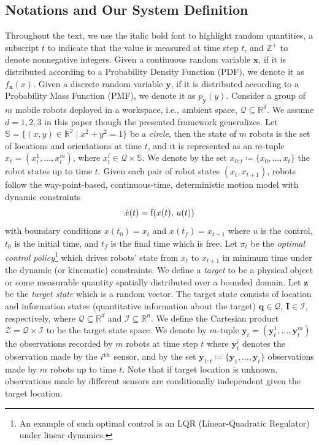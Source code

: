 \documentclass[journal]{IEEEtran}
\begin{document}
\subsection{Notations and Our System Definition}
Throughout the text, we use the italic bold font to highlight random quantities, a subscript $t$ to indicate that the value is measured at time step $t$, and $\mathbb{Z}^{+}$ to denote nonnegative integers. Given a continuous random variable $\bm{x}$, if it is distributed according to a Probability Density Function (PDF), we denote it as $f_{\bm{x}}(x)$. Given a discrete random variable $\bm{y}$, if it is distributed according to a Probability Mass Function (PMF), we denote it as $p_{\bm{y}}(y)$.
Consider a group of $m$ mobile robots deployed in a workspace, i.e., ambient space, $\mathcal{Q} \subseteq \mathbb{R}^d$. We assume $d=1,2,3$ in this paper though the presented framework generalizes. Let $\mathbb{S} =  \lbrace (x,y)\in \mathbb{R}^2\mid x^2+y^2=1 \rbrace$ be a \emph{circle}, then the state of $m$ robots is the set of locations and orientations at time $t$, and it is represented as an $m$-tuple $x_t = (x_t^1,\dots,x_t^m)$, where $x_t^i \in \mathcal{Q} \times \mathbb{S}$. We denote by the set  ${x}_{0:t}\coloneqq \lbrace {x}_0,\dots,{x}_t \rbrace$ the robot states up to time $t$. 
Given each pair of robot states $(x_t,x_{t+1})$, robots follow the way-point-based, continuous-time, deterministic motion model with dynamic constraints
\begin{equation}
\dot{x}(t) = \textup{f}(x(t),\,u(t))
\label{eq:constraint}
\end{equation}
with boundary conditions $x(t_0) = x_t$ and $x(t_f) = x_{t+1}$ where $u$ is the control, $t_0$ is the initial time, and $t_f$ is the final time which is free. Let $\pi_t$ be the \emph{optimal control policy}\footnote{An example of such optimal control is an LQR (Linear-Quadratic Regulator) under linear dynamics.} which drives robots' state from $x_t$ to $x_{t+1}$ in minimum time under the dynamic (or kinematic) constraints.
We define a \emph{target} to be a physical object or some measurable quantity spatially distributed over a bounded domain.
Let $\bm{z}$ be the \emph{target state} which is a random vector. The target state consists of location and information states (quantitative information about the target) $\bm{q} \in \mathcal{Q}$, $\bm{I} \in \mathcal{I}$, respectively, where $\mathcal{Q} \subseteq \mathbb{R}^d$ and $\mathcal{I} \subseteq \mathbb{R}^n$. We define the Cartesian product $\mathcal{Z} = \mathcal{Q} \times \mathcal{I}$ to be the target state space.
We denote by $m$-tuple $\bm{y}_t=(\bm{y}_t^1,\dots,\bm{y}_t^m)$ the observations recorded by $m$ robots at time step $t$ where $\bm{y}_t^i$ denotes the observation made by the $i^{\textup{th}}$ sensor, and by the set $\bm{y}_{1:t}\coloneqq \lbrace \bm{y}_1,\dots,\bm{y}_t \rbrace$ observations made by $m$ robots up to time $t$. Note that if target location is unknown, observations made by different sensors are conditionally independent given the target location.
\end{document}
